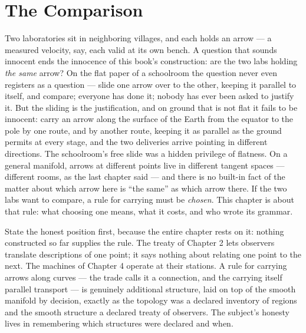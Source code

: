 \chapter{The Comparison}

Two laboratories sit in neighboring villages, and each holds an arrow ---
a measured velocity, say, each valid at its own bench. A question that
sounds innocent ends the innocence of this book's construction: are the
two labs holding \emph{the same} arrow? On the flat paper of a schoolroom
the question never even registers as a question --- slide one arrow over
to the other, keeping it parallel to itself, and compare; everyone has
done it; nobody has ever been asked to justify it. But the sliding is the
justification, and on ground that is not flat it fails to be innocent:
carry an arrow along the surface of the Earth from the equator to the
pole by one route, and by another route, keeping it as parallel as the
ground permits at every stage, and the two deliveries arrive pointing in
different directions. The schoolroom's free slide was a hidden privilege
of flatness. On a general manifold, arrows at different points live in
different tangent spaces --- different rooms, as the last chapter said ---
and there is no built-in fact of the matter about which arrow here is
``the same'' as which arrow there. If the two labs want to compare, a
rule for carrying must be \emph{chosen}. This chapter is about that rule:
what choosing one means, what it costs, and who wrote its grammar.

State the honest position first, because the entire chapter rests on it:
nothing constructed so far supplies the rule. The treaty of Chapter 2
lets observers translate descriptions of one point; it says nothing about
relating one point to the next. The machines of Chapter 4 operate at
their stations. A rule for carrying arrows along curves --- the trade
calls it a connection, and the carrying itself parallel transport --- is
genuinely additional structure, laid on top of the smooth manifold by
decision, exactly as the topology was a declared inventory of regions and
the smooth structure a declared treaty of observers. The subject's
honesty lives in remembering which structures were declared and when.

